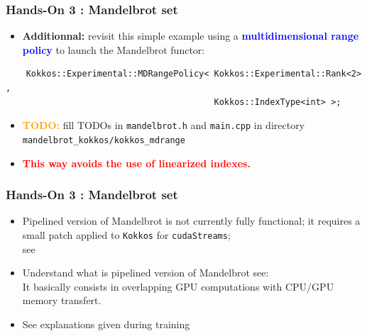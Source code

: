 \begin{frame}[fragile=singleslide]
  \frametitle{Hands-On 3 : Mandelbrot set}

  \begin{itemize}
  \item {\bf Additionnal:} revisit this simple example using a \textcolor{blue}{\bf multidimensional range policy} to launch the Mandelbrot functor:
  \end{itemize}
  \begin{verbatim}
    Kokkos::Experimental::MDRangePolicy< Kokkos::Experimental::Rank<2> ,
                                         Kokkos::IndexType<int> >;
  \end{verbatim}
  \begin{itemize}
  \item \textcolor{orange}{\textbf{TODO:}} fill TODOs in \texttt{mandelbrot.h} and \texttt{main.cpp} in directory \texttt{mandelbrot\_kokkos/kokkos\_mdrange}
  \item \textcolor{red}{\bf This way avoids the use of linearized indexes.}
  \end{itemize}

\end{frame}

\begin{frame}[fragile=singleslide]
  \frametitle{Hands-On 3 : Mandelbrot set}

  \begin{itemize}
  \item Pipelined version of Mandelbrot is not currently fully functional; it requires a small patch applied to \texttt{Kokkos} for \texttt{cudaStreams};\\
    see 
  \item Understand what is pipelined version of Mandelbrot see:
    {\scriptsize {}}\\
    It basically consists in overlapping GPU computations with CPU/GPU memory transfert.
  \item See explanations given during training
  \end{itemize}

\end{frame}
